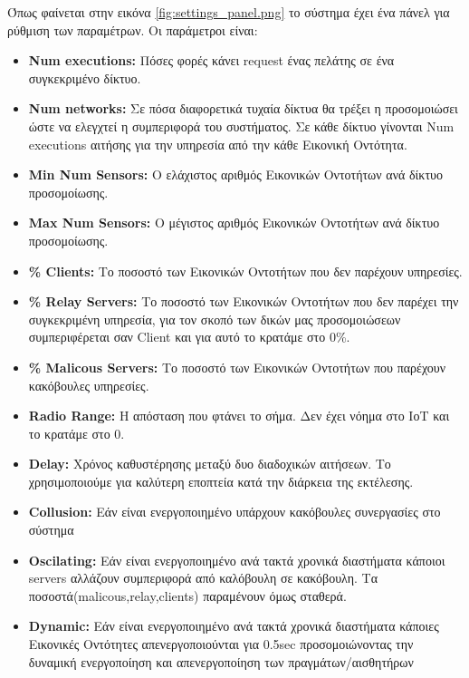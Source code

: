 Όπως φαίνεται στην εικόνα \ref{fig:settings_panel.png} το σύστημα έχει ένα πάνελ για ρύθμιση των παραμέτρων. Οι παράμετροι είναι:
\begin{itemize}
\item \textbf{Num executions:} Πόσες φορές κάνει request ένας πελάτης σε ένα συγκεκριμένο δίκτυο.
\item \textbf{Num networks:} Σε πόσα διαφορετικά τυχαία δίκτυα θα τρέξει η προσομοιώσει ώστε να ελεγχτεί η συμπεριφορά του συστήματος. Σε κάθε δίκτυο γίνονται Num executions αιτήσης για την υπηρεσία από την κάθε Εικονική Οντότητα.
\item \textbf{Min Num Sensors:} O ελάχιστος αριθμός Εικονικών Οντοτήτων ανά δίκτυο προσομοίωσης.
\item \textbf{Μax Num Sensors:} O μέγιστος αριθμός Εικονικών Οντοτήτων ανά δίκτυο προσομοίωσης.

\item \textbf{\% Clients:} Το ποσοστό των Εικονικών Οντοτήτων που δεν παρέχουν  υπηρεσίες.

\item \textbf{\% Relay Servers:} Το ποσοστό των Εικονικών Οντοτήτων που δεν παρέχει την συγκεκριμένη υπηρεσία, για τον σκοπό των δικών μας προσομοιώσεων συμπεριφέρεται σαν Client και για αυτό το κρατάμε στο 0\%.

\item \textbf{\% Malicous Servers:} Το ποσοστό των Εικονικών Οντοτήτων που παρέχουν κακόβουλες υπηρεσίες.

\item \textbf{Radio Range:} Η απόσταση που φτάνει το σήμα. Δεν έχει νόημα στο ΙοΤ και το κρατάμε στο 0.

\item \textbf{Delay:} Χρόνος καθυστέρησης μεταξύ δυο διαδοχικών αιτήσεων. Το χρησιμοποιούμε για καλύτερη εποπτεία κατά την διάρκεια της εκτέλεσης.

\item \textbf{Collusion:} Εάν είναι ενεργοποιημένο υπάρχουν κακόβουλες συνεργασίες στο σύστημα

\item \textbf{Oscilating:} Εάν είναι ενεργοποιημένο ανά τακτά χρονικά διαστήματα κάποιοι servers αλλάζουν συμπεριφορά από καλόβουλη σε κακόβουλη. Τα ποσοστά(malicous,relay,clients) παραμένουν όμως σταθερά.

\item \textbf{Dynamic:} Εάν είναι ενεργοποιημένο ανά τακτά χρονικά διαστήματα κάποιες Εικονικές Οντότητες απενεργοποιούνται για 0.5sec προσομοιώνοντας την δυναμική ενεργοποίηση και απενεργοποίηση των πραγμάτων/αισθητήρων
\end{itemize}
\newpage
{}


